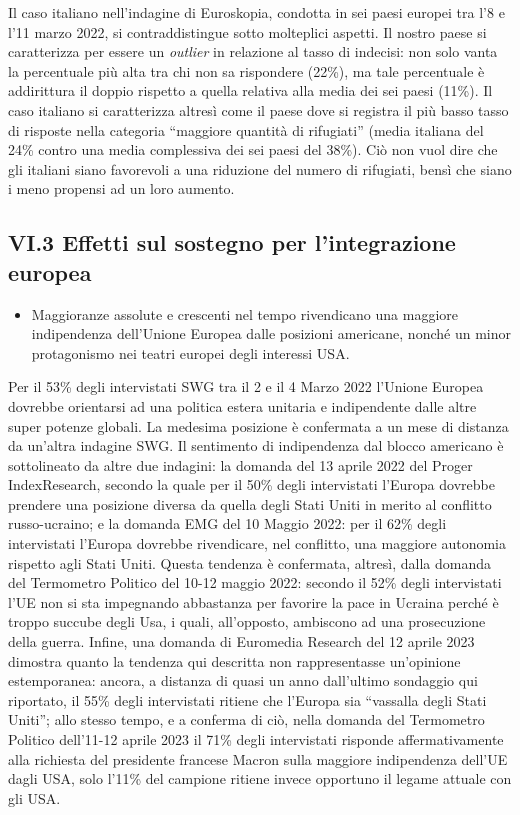\documentclass[
  openany]{book}
\providecommand{\tightlist}{%
  \setlength{\itemsep}{0pt}\setlength{\parskip}{0pt}}
\begin{document}
Il caso italiano nell'indagine di Euroskopia, condotta in sei paesi europei tra l'8 e l'11 marzo 2022, si contraddistingue sotto molteplici aspetti. Il nostro paese si caratterizza per essere un \emph{outlier} in relazione al tasso di indecisi: non solo vanta la percentuale più alta tra chi non sa rispondere (22\%), ma tale percentuale è addirittura il doppio rispetto a quella relativa alla media dei sei paesi (11\%).
Il caso italiano si caratterizza altresì come il paese dove si registra il più basso tasso di risposte nella categoria ``maggiore quantità di rifugiati'' (media italiana del 24\% contro una media complessiva dei sei paesi del 38\%). Ciò non vuol dire che gli italiani siano favorevoli a una riduzione del numero di rifugiati, bensì che siano i meno propensi ad un loro aumento.

\hypertarget{vi.3-effetti-sul-sostegno-per-lintegrazione-europea}{%
\subsection{VI.3 Effetti sul sostegno per l'integrazione europea}\label{vi.3-effetti-sul-sostegno-per-lintegrazione-europea}}

\begin{itemize}
\tightlist
\item
  Maggioranze assolute e crescenti nel tempo rivendicano una maggiore indipendenza dell'Unione Europea dalle posizioni americane, nonché un minor protagonismo nei teatri europei degli interessi USA.
\end{itemize}

Per il 53\% degli intervistati SWG tra il 2 e il 4 Marzo 2022 l'Unione Europea dovrebbe orientarsi ad una politica estera unitaria e indipendente dalle altre super potenze globali. La medesima posizione è confermata a un mese di distanza da un'altra indagine SWG. Il sentimento di indipendenza dal blocco americano è sottolineato da altre due indagini: la domanda del 13 aprile 2022 del Proger IndexResearch, secondo la quale per il 50\% degli intervistati l'Europa dovrebbe prendere una posizione diversa da quella degli Stati Uniti in merito al conflitto russo-ucraino; e la domanda EMG del 10 Maggio 2022: per il 62\% degli intervistati l'Europa dovrebbe rivendicare, nel conflitto, una maggiore autonomia rispetto agli Stati Uniti. Questa tendenza è confermata, altresì, dalla domanda del Termometro Politico del 10-12 maggio 2022: secondo il 52\% degli intervistati l'UE non si sta impegnando abbastanza per favorire la pace in Ucraina perché è troppo succube degli Usa, i quali, all'opposto, ambiscono ad una prosecuzione della guerra. Infine, una domanda di Euromedia Research del 12 aprile 2023 dimostra quanto la tendenza qui descritta non rappresentasse un'opinione estemporanea: ancora, a distanza di quasi un anno dall'ultimo sondaggio qui riportato, il 55\% degli intervistati ritiene che l'Europa sia ``vassalla degli Stati Uniti''; allo stesso tempo, e a conferma di ciò, nella domanda del Termometro Politico dell'11-12 aprile 2023 il 71\% degli intervistati risponde affermativamente alla richiesta del presidente francese Macron sulla maggiore indipendenza dell'UE dagli USA, solo l'11\% del campione ritiene invece opportuno il legame attuale con gli USA.
\end{document}
